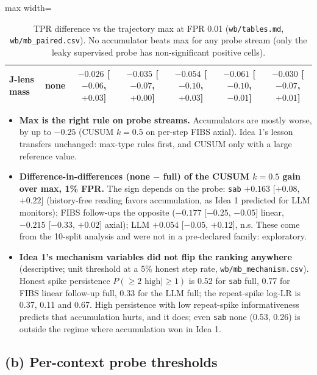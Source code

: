 \documentclass[11pt]{article}
\begin{document}
\begin{table}[!htbp]
\begin{adjustbox}{max width=\linewidth}
\begin{tabular}{@{}llccccc@{}}
J-lens mass & none & $-0.026$ [$-0.06$, $+0.03$] & $-0.035$ [$-0.07$, $+0.00$] & $-0.054$ [$-0.10$, $+0.03$] & $-0.061$ [$-0.10$, $-0.01$] & $-0.030$ [$-0.07$, $+0.01$]\\
\bottomrule
\end{tabular}\end{adjustbox}
\caption{TPR difference vs the trajectory max at FPR 0.01 (\nolinkurl{wb/tables.md}, \nolinkurl{wb/mb_paired.csv}). No accumulator beats max for any probe stream (only the leaky supervised probe has non-significant positive cells).}\label{tab:acc}
\end{table}

\begin{itemize}
\item \textbf{Max is the right rule on probe streams.} Accumulators are mostly worse, by up to $-0.25$ (CUSUM $k{=}0.5$ on per-step FIBS axial). Idea 1's lesson transfers unchanged: max-type rules first, and CUSUM only with a large reference value.
\item \textbf{Difference-in-differences (none $-$ full) of the CUSUM $k{=}0.5$ gain over max, 1\% FPR.} The sign depends on the probe: \texttt{sab} $+0.163$ [$+0.08$, $+0.22$] (history-free reading favors accumulation, as Idea 1 predicted for LLM monitors); FIBS follow-ups the opposite ($-0.177$ [$-0.25$, $-0.05$] linear, $-0.215$ [$-0.33$, $+0.02$] axial); LLM $+0.054$ [$-0.05$, $+0.12$], n.s. These come from the 10-split analysis and were not in a pre-declared family: exploratory.
\item \textbf{Idea 1's mechanism variables did not flip the ranking anywhere} (descriptive; unit threshold at a 5\% honest step rate, \nolinkurl{wb/mb_mechanism.csv}). Honest spike persistence $P(\ge2\text{ high}\mid\ge1)$ is 0.52 for \texttt{sab} full, 0.77 for FIBS linear follow-up full, 0.33 for the LLM full; the repeat-spike log-LR is 0.37, 0.11 and 0.67. High persistence with low repeat-spike informativeness predicts that accumulation hurts, and it does; even \texttt{sab} none (0.53, 0.26) is outside the regime where accumulation won in Idea 1.
\end{itemize}

\subsection{(b) Per-context probe thresholds}\label{sec:ctx}
\end{document}
